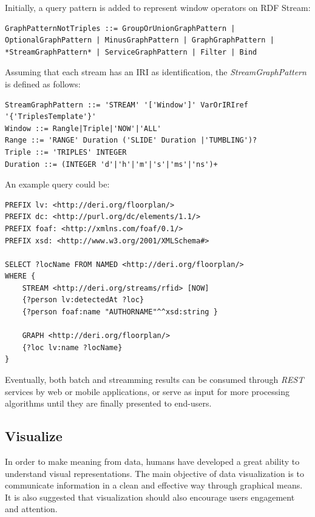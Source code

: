 Initially, a query pattern is added to represent window operators on RDF Stream:

\begin{lstlisting}
GraphPatternNotTriples ::= GroupOrUnionGraphPattern |
OptionalGraphPattern | MinusGraphPattern | GraphGraphPattern |
*StreamGraphPattern* | ServiceGraphPattern | Filter | Bind
\end{lstlisting}

Assuming that each stream has an IRI as identification, the \textit{StreamGraphPattern} is defined as follows:

\begin{lstlisting}
StreamGraphPattern ::= 'STREAM' '['Window']' VarOrIRIref 
'{'TriplesTemplate'}'
Window ::= Rangle|Triple|'NOW'|'ALL'
Range ::= 'RANGE' Duration ('SLIDE' Duration |'TUMBLING')?
Triple ::= 'TRIPLES' INTEGER
Duration ::= (INTEGER 'd'|'h'|'m'|'s'|'ms'|'ns')+
\end{lstlisting}

An example query could be:

\begin{lstlisting}
PREFIX lv: <http://deri.org/floorplan/>
PREFIX dc: <http://purl.org/dc/elements/1.1/>
PREFIX foaf: <http://xmlns.com/foaf/0.1/>
PREFIX xsd: <http://www.w3.org/2001/XMLSchema#>

SELECT ?locName FROM NAMED <http://deri.org/floorplan/> 
WHERE {
	STREAM <http://deri.org/streams/rfid> [NOW]
	{?person lv:detectedAt ?loc}
	{?person foaf:name "AUTHORNAME"^^xsd:string }

	GRAPH <http://deri.org/floorplan/>
	{?loc lv:name ?locName}
}
\end{lstlisting}

Eventually, both batch and streamming results can be consumed through \textit{REST} services by web or mobile applications, or serve as input for more processing algorithms until they are finally presented to end-users.

\subsection{Visualize}

In order to make meaning from data, humans have developed a great ability to understand visual representations. The main objective of data visualization is to communicate information in a clean and effective way through graphical means. It is also suggested that visualization should also encourage users engagement and attention.

